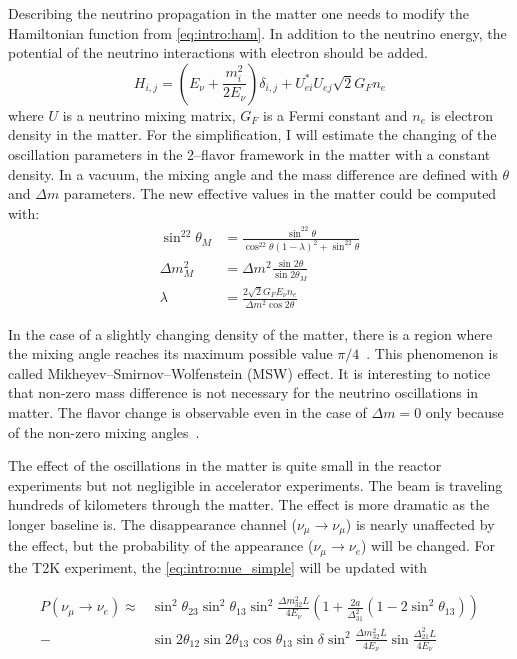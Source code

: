 \documentclass[../main.tex]{subfiles}
\begin{document}
Describing the neutrino propagation in the matter one needs to modify the Hamiltonian function from \autoref{eq:intro:ham}. In addition to the neutrino energy, the potential of the neutrino interactions with electron should be added.
\begin{equation}
H_{i,j}=\left(E_\nu+\frac{m_i^2}{2E_\nu}\right)\delta_{i,j}+U_{ei}^*U_{ej}\sqrt2G_Fn_e
\end{equation}
where $U$ is a neutrino mixing matrix, $G_F$ is a Fermi constant and $n_e$ is electron density in the matter. For the simplification, I will estimate the changing of the oscillation parameters in the 2--flavor framework in the matter with a constant density. In a vacuum, the mixing angle and the mass difference are defined with $\theta$ and $\Delta m$ parameters. The new effective values in the matter could be computed with:
\begin{align}
\sin^22\theta_M&=\frac{\sin^22\theta}{\cos^22\theta(1-\lambda)^2+\sin^22\theta} \\
\Delta m^2_M&=\Delta m^2\frac{\sin2\theta}{\sin2\theta_M} \\
\lambda&=\frac{2\sqrt2G_FE_\nu n_e}{\Delta m^2\cos2\theta}
\end{align}

In the case of a slightly changing density of the matter, there is a region where the mixing angle reaches its maximum possible value $\pi/4$~\cite{Mikheyev1985}. This phenomenon is called Mikheyev–Smirnov–Wolfenstein (MSW) effect. It is interesting to notice that non-zero mass difference is not necessary for the neutrino oscillations in matter. The flavor change is observable even in the case of $\Delta m=0$ only because of the non-zero mixing angles~\cite{Smirnov2016}.

The effect of the oscillations in the matter is quite small in the reactor experiments but not negligible in accelerator experiments. The beam is traveling hundreds of kilometers through the matter. The effect is more dramatic as the longer baseline is. The disappearance channel ($\nu_\mu\to\nu_\mu$) is nearly unaffected by the effect, but the probability of the appearance ($\nu_\mu\to\nu_e$) will be changed. For the T2K experiment, the \autoref{eq:intro:nue_simple} will be updated with

\begin{align}
P\left(\nu_\mu\to\nu_e\right)\approx&\sin^2\theta_{23}\sin^2\theta_{13}\sin^2\frac{\Delta m_{32}^2L}{4E_\nu}\left(1+\frac{2a}{\Delta_{31}^2}\left(1-2\sin^2\theta_{13}\right)\right) \\
-&\sin2\theta_{12}\sin2\theta_{13}\cos\theta_{13}\sin\delta\sin^2\frac{\Delta m_{32}^2L}{4E_\nu}\sin\frac{\Delta_{21}^2L}{4E_\nu}
\end{align}
\end{document}
